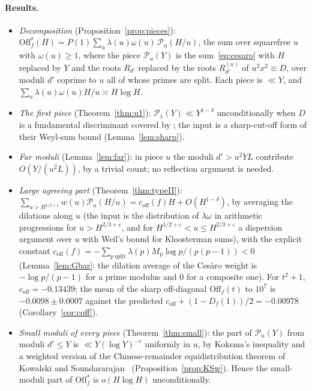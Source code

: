 \documentclass[11pt,a4paper]{article}
\theoremstyle{remark}\newtheorem{remark}[theorem]{Remark}
\newcommand{\Off}{\mathrm{Off}}\newcommand{\e}{\mathrm{e}}
\begin{document}
\paragraph{Results.}
\begin{itemize}
\item \emph{Decomposition} (Proposition~\ref{prop:pieces}): $\Off^\ast_f(H)=P(1)\sum_u\lambda(u)\omega(u)\,\mathcal P_u(H/u)$,
the sum over squarefree $u$ with $\omega(u)\ge1$, where the piece $\mathcal P_u(Y)$ is the sum~\eqref{eq:cesaro} with
$H$ replaced by $Y$ and the roots $R_{d'}$ replaced by the roots $R^{(u)}_{d'}$ of $u^2x^2\equiv D$, over moduli
$d'$ coprime to $u$ all of whose primes are split. Each piece is $\ll Y$, and $\sum_u\lambda(u)\omega(u)H/u\asymp H\log H$.
\item \emph{The first piece} (Theorem~\ref{thm:u1}): $\mathcal P_1(Y)\ll Y^{1-\delta}$ unconditionally when $D$
is a fundamental discriminant covered by \cite{DFI2012}; the input is a sharp-cut-off form of their Weyl-sum
bound (Lemma~\ref{lem:sharp}).
\item \emph{Far moduli} (Lemma~\ref{lem:far}): in piece $u$ the moduli $d'>u^2YL$ contribute $O(Y/(u^2L))$, by a
trivial count; no reflection argument is needed.
\item \emph{Large agreeing part} (Theorem~\ref{thm:typeII}): $\sum_{u>H^{1/2+\varepsilon}}w(u)\mathcal P_u(H/u)=c_{\mathrm{off}}(f)H+O(H^{1-\delta})$,
by averaging the dilations along $u$ (the input is the distribution of $\lambda\omega$ in arithmetic progressions for $u>H^{2/3+\varepsilon}$,
and for $H^{1/2+\varepsilon}<u\le H^{2/3+\varepsilon}$ a dispersion argument over $u$ with Weil's bound for Kloosterman sums),
with the explicit constant $c_{\mathrm{off}}(f)=-\sum_{p\ \mathrm{split}}\lambda(p)M_p\log p/(p(p-1))<0$
(Lemma~\ref{lem:Gbar}: the dilation average of the Ces\`aro weight is $-\log p/(p-1)$ for a prime modulus and $0$
for a composite one). For $t^2+1$, $c_{\mathrm{off}}=-0.13439$; the mean of the sharp off-diagonal $\Off_f(t)$ to $10^7$ is
$-0.0098\pm0.0007$ against the predicted $c_{\mathrm{off}}+(1-D_f(1))/2=-0.00978$ (Corollary~\ref{cor:coff}).
\item \emph{Small moduli of every piece} (Theorem~\ref{thm:small}): the part of $\mathcal P_u(Y)$ from
moduli $d'\le Y$ is $\ll Y(\log Y)^{-c}$ uniformly in $u$, by Koksma's inequality and a weighted version of
the Chinese-remainder equidistribution theorem of Kowalski and Soundararajan~\cite{KowalskiSoundararajan2021}
(Proposition~\ref{prop:KSw}). Hence the small-moduli part of $\Off^\ast_f$ is $o(H\log H)$ unconditionally.

\end{itemize}
\end{document}
